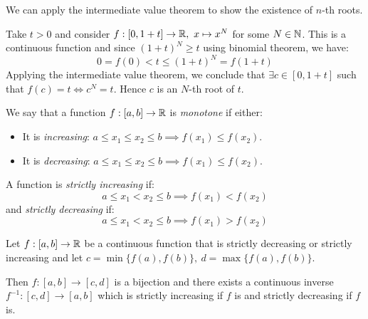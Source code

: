 \documentclass[../main.tex]{subfiles}
\begin{document}
\begin{example}[$n$-th Roots]
  We can apply the intermediate value theorem to show the existence of $n$-th roots.

  Take $t > 0$ and consider $f: [0, 1 + t] \to \mathbb{R},\ x \mapsto x^{N}$ for some $N \in \mathbb{N}$.
  This is a continuous function and since $(1 + t)^{N} \geq t$ using binomial theorem, we have:
  \[
    0 = f(0) < t \leq (1 + t)^{N} = f(1 + t)
  \]
  Applying the intermediate value theorem, we conclude that $\exists c \in [0, 1 + t]$ such that $f(c) = t \iff c^{N} = t$.
  Hence $c$ is an $N$-th root of $t$.
\end{example}
\begin{definition}
  We say that a function $f: [a, b] \to \mathbb{R}$ is \textit{monotone} if either:
  \begin{itemize}
    \item It is \textit{increasing}: $a \leq x_1 \leq x_2 \leq b \implies f(x_1) \leq f(x_2)$.
    \item It is \textit{decreasing}: $a \leq x_1 \leq x_2 \leq b \implies f(x_1) \leq f(x_2)$.
  \end{itemize}
\end{definition}
\begin{remark}
  A function is \textit{strictly increasing} if:
  \[
    a \leq x_1 < x_2 \leq b \implies f(x_1) < f(x_2)
  \]
  and \textit{strictly decreasing} if:
  \[
    a \leq x_1 < x_2 \leq b \implies f(x_1) > f(x_2)
  \]
\end{remark}
\begin{proposition}
  Let $f: [a, b] \to \mathbb{R}$ be a continuous function that is strictly decreasing or strictly increasing and let $c = \min\{f(a), f(b)\},\ d = \max\{f(a), f(b)\}$.
  \label{inverseFunctionMonotone}

  Then $f: [a, b] \to [c, d]$ is a bijection and there exists a continuous inverse $f^{-1}: [c, d] \to [a, b]$ which is strictly increasing if $f$ is and strictly decreasing if $f$ is.
\end{proposition}
\end{document}
